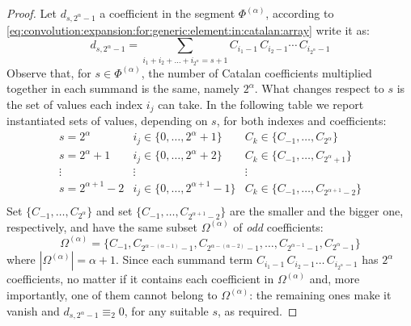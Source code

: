 \begin{proof}
Let $d_{s,2^{\alpha}-1}$ a coefficient in the segment $\Phi^{(\alpha)}$, 
according to \autoref{eq:convolution:expansion:for:generic:element:in:catalan:array} 
write it as:
\begin{displaymath}
    d_{s, 2^{\alpha}-1} = \sum_{i_{1}+i_{2}+\ldots+i_{2^{\alpha}}=s+1}
        {C_{i_{1}-1}\,C_{i_{2}-1}\cdots\,C_{i_{2^{\alpha}}-1}}
\end{displaymath}
Observe that, for $s\in\Phi^{(\alpha)}$, the number of Catalan
coefficients multiplied together in each summand is the same, namely
$2^{\alpha}$.  What changes respect to $s$ is the set of values each
index $i_{j}$ can take. In the following table we report instantiated sets
of values, depending on $s$, for both indexes and coefficients:
\begin{displaymath}
    \begin{array}{c|c|c}
        s = 2^{\alpha} 
            & i_{j}\in\lbrace0,\ldots,2^{\alpha}+1\rbrace 
            & C_{k}\in\lbrace C_{-1},\ldots,C_{2^{\alpha}}\rbrace\\
        s = 2^{\alpha} +1
            & i_{j}\in\lbrace0,\ldots,2^{\alpha}+2\rbrace 
            & C_{k}\in\lbrace C_{-1},\ldots,C_{2^{\alpha}+1}\rbrace\\
        \vdots & \vdots&\vdots \\
        s = 2^{\alpha+1} -2
            & i_{j}\in\lbrace0,\ldots,2^{\alpha+1}-1\rbrace 
            & C_{k}\in\lbrace C_{-1},\ldots,C_{2^{\alpha+1}-2}\rbrace\\
    \end{array}
\end{displaymath}
Set $\lbrace C_{-1},\ldots,C_{2^{\alpha}}\rbrace$ and set
$\lbrace C_{-1},\ldots,C_{2^{\alpha+1}-2}\rbrace$ are the smaller and the bigger one, respectively, and
have the same subset $\Omega^{(\alpha)}$ of \emph{odd} coefficients: 
\begin{displaymath}
    \Omega^{(\alpha)}=\lbrace C_{-1}, C_{2^{\alpha-(\alpha-1)}-1},C_{2^{\alpha-(\alpha-2)}-1},\ldots, 
        C_{2^{\alpha-1}-1},C_{2^{\alpha}-1}\rbrace
\end{displaymath}
where $\left|\Omega^{(\alpha)}\right|=\alpha+1$.
Since each summand term $C_{i_{1}-1}\,C_{i_{2}-1}\ldots\,C_{i_{2^{\alpha}}-1}$ 
has $2^{\alpha}$ coefficients, no matter if it contains each coefficient in $\Omega^{(\alpha)}$ and,
more importantly, one of them cannot belong to $\Omega^{(\alpha)}$:
the remaining ones make it vanish and $d_{s, 2^{\alpha}-1} \equiv_{2} 0$, for any suitable $s$,
as required.

\end{proof}

